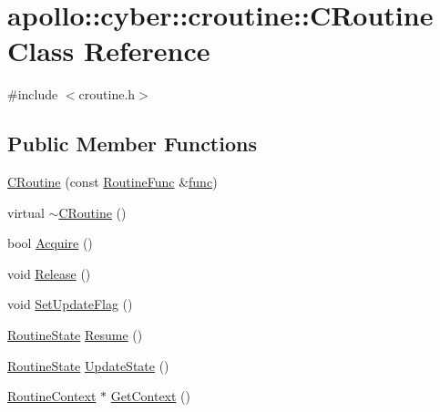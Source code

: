 \hypertarget{classapollo_1_1cyber_1_1croutine_1_1CRoutine}{\section{apollo\-:\-:cyber\-:\-:croutine\-:\-:C\-Routine Class Reference}
\label{classapollo_1_1cyber_1_1croutine_1_1CRoutine}
}


{\ttfamily \#include $<$croutine.\-h$>$}

\subsection*{Public Member Functions}
\begin{DoxyCompactItemize}
\item 
\hyperlink{classapollo_1_1cyber_1_1croutine_1_1CRoutine_a975b0f29db65bec8b2e333610da3c0bc}{C\-Routine} (const \hyperlink{namespaceapollo_1_1cyber_1_1croutine_a5c1d994c8a08504b270fd8c4ba57d282}{Routine\-Func} \&\hyperlink{namespaceapollo_1_1cyber_1_1croutine_a10b1486257a9f9174f905a6f4a54523f}{func})
\item 
virtual \hyperlink{classapollo_1_1cyber_1_1croutine_1_1CRoutine_a2a69d0e45efb1b84b591adf8cd2c7212}{$\sim$\-C\-Routine} ()
\item 
bool \hyperlink{classapollo_1_1cyber_1_1croutine_1_1CRoutine_ada6c072e791b4f0ee01fc4e41bffebfb}{Acquire} ()
\item 
void \hyperlink{classapollo_1_1cyber_1_1croutine_1_1CRoutine_af4f0281b87b2b0f37bf2526c1073143b}{Release} ()
\item 
void \hyperlink{classapollo_1_1cyber_1_1croutine_1_1CRoutine_aab4da1d64d40ce35e4054b867bfdeab9}{Set\-Update\-Flag} ()
\item 
\hyperlink{namespaceapollo_1_1cyber_1_1croutine_a9b2ec600d9734ed2e857a7235cec5e48}{Routine\-State} \hyperlink{classapollo_1_1cyber_1_1croutine_1_1CRoutine_af0e8e2d8bd5e06088951633585e770e4}{Resume} ()
\item 
\hyperlink{namespaceapollo_1_1cyber_1_1croutine_a9b2ec600d9734ed2e857a7235cec5e48}{Routine\-State} \hyperlink{classapollo_1_1cyber_1_1croutine_1_1CRoutine_abe2081e7ccc944e14a13ee5140f6dc3f}{Update\-State} ()
\item 
\hyperlink{structapollo_1_1cyber_1_1croutine_1_1RoutineContext}{Routine\-Context} $\ast$ \hyperlink{classapollo_1_1cyber_1_1croutine_1_1CRoutine_adc87070b8f79e63163e7aff885e84e84}{Get\-Context} ()
\item 

\end{DoxyCompactItemize}
